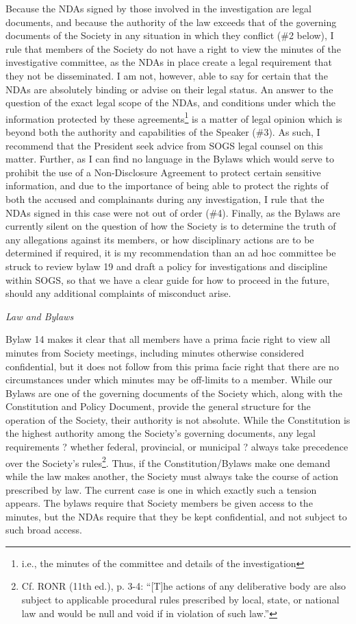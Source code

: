 \begin{longenum}[ label*=\arabic*., align=left]
\begin{longenum}
Because the NDAs signed by those involved in the investigation are legal documents, and because the authority of the law exceeds that of the governing documents of the Society in any situation in which they conflict (\#2 below), I rule that members of the Society do not have a right to view the minutes of the investigative committee, as the NDAs in place create a legal requirement that they not be disseminated.
I am not, however, able to say for certain that the NDAs are absolutely binding or advise on their legal status. An answer to the question of the exact legal scope of the NDAs, and conditions under which the information protected by these agreements\footnote{i.e., the minutes of the committee and details of the investigation}  is a matter of legal opinion which is beyond both the authority and capabilities of the Speaker (\#3). As such, I recommend that the President seek advice from SOGS legal counsel on this matter.
Further, as I can find no language in the Bylaws which would serve to prohibit the use of a Non-Disclosure Agreement to protect certain sensitive information, and due to the importance of being able to protect the rights of both the accused and complainants during any investigation, I rule that the NDAs signed in this case were not out of order (\#4).
Finally, as the Bylaws are currently silent on the question of how the Society is to determine the truth of any allegations against its members, or how disciplinary actions are to be determined if required, it is my recommendation than an ad hoc committee be struck to review bylaw 19 and draft a policy for investigations and discipline within SOGS, so that we have a clear guide for how to proceed in the future, should any additional complaints of misconduct arise.

\item \textit{Law and Bylaws}

Bylaw 14 makes it clear that all members have a prima facie right to view all minutes from Society meetings, including minutes otherwise considered confidential, but it does not follow from this prima facie right that there are no circumstances under which minutes may be off-limits to a member.
While our Bylaws are one of the governing documents of the Society which, along with the Constitution and Policy Document, provide the general structure for the operation of the Society, their authority is not absolute. While the Constitution is the highest authority among the Society's governing documents, any legal requirements ? whether federal, provincial, or municipal ? always take precedence over the Society's rules\footnote{Cf. RONR (11th ed.), p. 3-4: ``[T]he actions of any deliberative body are also subject to applicable procedural rules prescribed by local, state, or national law and would be null and void if in violation of such law.''}.  Thus, if the Constitution/Bylaws make one demand while the law makes another, the Society must always take the course of action prescribed by law.
The current case is one in which exactly such a tension appears. The bylaws require that Society members be given access to the minutes, but the NDAs require that they be kept confidential, and not subject to such broad access.


\end{longenum}
\end{longenum}
